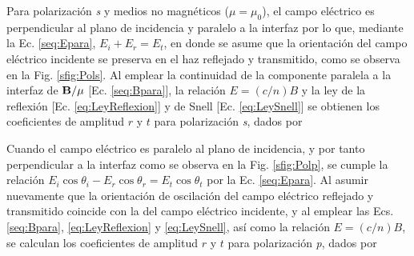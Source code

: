 Para polarización \emph{s} y medios no magnéticos ($\mu=\mu_0$),  el campo eléctrico es perpendicular al plano de incidencia y paralelo a la interfaz por lo que, mediante la Ec. \eqref{seq:Epara}, $E_i + E_r = E_t$, en donde se asume que la orientación del campo eléctrico incidente se preserva en el haz reflejado y transmitido, como se observa en la Fig. \ref{sfig:Pols}. Al emplear la continuidad de la componente paralela a la interfaz de $\vb{B}/\mu$ [Ec. \eqref{seq:Bpara}], la relación $E = (c/n) B$ y la ley de la reflexión [Ec. \eqref{eq:LeyReflexion}] y de Snell [Ec. \eqref{eq:LeySnell}] se obtienen los coeficientes de amplitud $r$ y $t$ para  polarización \emph{s}, dados por\vspace{-.5em}
	\begin{tcolorbox}[title = Coeficientes de amplitud para polarización \emph{s} ]
	\vspace*{-1em}	
	\end{tcolorbox}	 \vspace*{-.5em}\noindent
Cuando el campo eléctrico es paralelo al plano de incidencia, y por tanto perpendicular a la interfaz como se observa en la Fig. \ref{sfig:Polp}, se cumple la relación $E_i\cos\theta_i-E_r\cos\theta_r = E_t \cos\theta_t$ por la Ec. \eqref{seq:Epara}. Al asumir nuevamente que la orientación de oscilación del campo eléctrico reflejado y transmitido coincide con la del campo eléctrico incidente, y al emplear las Ecs. \eqref{seq:Bpara},  \eqref{eq:LeyReflexion} y  \eqref{eq:LeySnell}, así como la relación $E = (c/n) B$, se calculan los  coeficientes de amplitud $r$ y $t$ para  polarización \emph{p}, dados por  \vspace*{-.5em}
	\begin{tcolorbox}[title = Coeficientes de amplitud para polarización \emph{p} ]
	\vspace*{-1em}
	\end{tcolorbox}	

